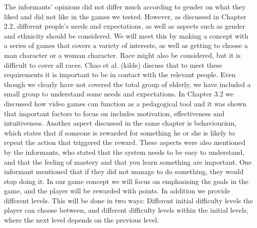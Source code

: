 The informants' opinions did not differ much according to gender on what they liked and did not like in the games we tested. However, as discussed in Chapter 2.2, different people's needs and expectations, as well as aspects such as gender and ethnicity should be considered. We will meet this by making a concept with a series of games that covers a variety of interests, as well as getting to choose a man character or a woman character. Race might also be considered, but it is difficult to cover all races. Chao et al. (kilde) discuss that to meet these requirements it is important to be in contact with the relevant people. Even though we clearly have not covered the total group of elderly, we have included a small group to understand some needs and expectations. In Chapter 3.2 we discussed how video games can function as a pedagogical tool and it was shown that important factors to focus on includes motivation, effectiveness and intuitiveness. Another aspect discussed in the same chapter is behaviourism, which states that if someone is rewarded for something he or she is likely to repeat the action that triggered the reward. These aspects were also mentioned by the informants, who stated that the system needs to be easy to understand, and that the feeling of mastery and that you learn something are important.  One informant mentioned that if they did not manage to do something, they would stop doing it. In our game concept we will focus on emphasising the goals in the game, and the player will be rewarded with points. In addition we provide different levels. This will be done  in two ways: Different initial difficulty levels the player can choose between, and different difficulty levels within the initial levels, where the next level depends on the previous level.  

